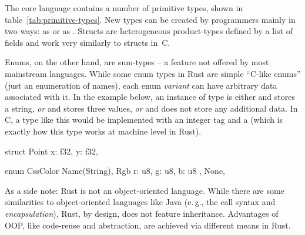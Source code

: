 The core language contains a number of primitive types, shown in table~\ref{tab:primitive-types}.
New types can be created by programmers mainly in two ways: as  or as .
Structs are heterogeneous product-types defined by a list of fields and work very similarly to structs in~C.

Enums, on the other hand, are sum-types -- a feature not offered by most mainstream languages.
While some enum types in Rust are simple \enquote{C-like enums} (just an enumeration of names), each enum \emph{variant} can have arbitrary data associated with it.
In the example below, an instance of type  is either  and stores a string, \emph{or}  and stores three  values, \emph{or}  and does not store any additional data.
In C, a type like this would be implemented with an integer tag and a  (which is exactly how this type works at machine level in Rust).

\vspace{-3mm}
\begin{center}
\begin{minipage}[t]{.45\textwidth}
\begin{rustcode}
struct Point {
    x: f32,
    y: f32,
}
\end{rustcode}
\end{minipage}
\begin{minipage}[t]{.45\textwidth}
\begin{rustcode}
enum CssColor {
    Name(String),
    Rgb { r: u8, g: u8, b: u8 },
    None,
}
\end{rustcode}
\end{minipage}
\end{center}

As a side note: Rust is not an object-oriented language.
While there are some similarities to object-oriented languages like Java (e.\,g., the  call syntax and \emph{encapsulation}), Rust, by design, does not feature inheritance.
Advantages of OOP, like code-reuse and abstraction, are achieved via different means in Rust.

